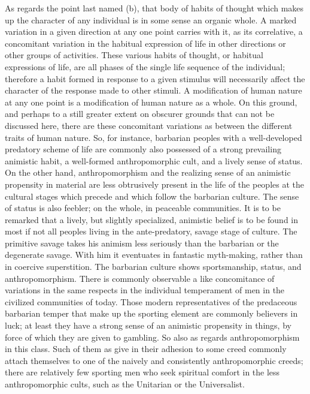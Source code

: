 \documentclass[12pt]{report}
\begin{document}
As regards the point last named (b), that body of habits of thought
which makes up the character of any individual is in some sense an
organic whole. A marked variation in a given direction at any one point
carries with it, as its correlative, a concomitant variation in the
habitual expression of life in other directions or other groups of
activities. These various habits of thought, or habitual expressions
of life, are all phases of the single life sequence of the individual;
therefore a habit formed in response to a given stimulus will
necessarily affect the character of the response made to other stimuli.
A modification of human nature at any one point is a modification of
human nature as a whole. On this ground, and perhaps to a still greater
extent on obscurer grounds that can not be discussed here, there are
these concomitant variations as between the different traits of human
nature. So, for instance, barbarian peoples with a well-developed
predatory scheme of life are commonly also possessed of a strong
prevailing animistic habit, a well-formed anthropomorphic cult, and
a lively sense of status. On the other hand, anthropomorphism and
the realizing sense of an animistic propensity in material are less
obtrusively present in the life of the peoples at the cultural stages
which precede and which follow the barbarian culture. The sense of
status is also feebler; on the whole, in peaceable communities. It is to
be remarked that a lively, but slightly specialized, animistic belief
is to be found in most if not all peoples living in the ante-predatory,
savage stage of culture. The primitive savage takes his animism less
seriously than the barbarian or the degenerate savage. With him
it eventuates in fantastic myth-making, rather than in coercive
superstition. The barbarian culture shows sportsmanship, status, and
anthropomorphism. There is commonly observable a like concomitance of
variations in the same respects in the individual temperament of men in
the civilized communities of today. Those modern representatives of
the predaceous barbarian temper that make up the sporting element are
commonly believers in luck; at least they have a strong sense of an
animistic propensity in things, by force of which they are given to
gambling. So also as regards anthropomorphism in this class. Such of
them as give in their adhesion to some creed commonly attach themselves
to one of the naively and consistently anthropomorphic creeds; there
are relatively few sporting men who seek spiritual comfort in the less
anthropomorphic cults, such as the Unitarian or the Universalist.
\end{document}
